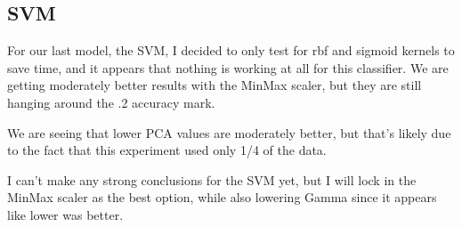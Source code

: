 \documentclass[12pt]{article}
\begin{document}
\subsection{SVM}

For our last model, the SVM, I decided to only test for rbf and sigmoid kernels to save time, and it appears that nothing 
is working at all for this classifier. We are getting moderately better results with the MinMax scaler, but they 
are still hanging around the .2 accuracy mark. 

We are seeing that lower PCA values are moderately better, but that's likely due to the fact that this experiment used 
only 1/4 of the data.

I can't make any strong conclusions for the SVM yet, but I will lock in the MinMax scaler as the best option, while 
also lowering Gamma since it appears like lower was better.
\end{document}
